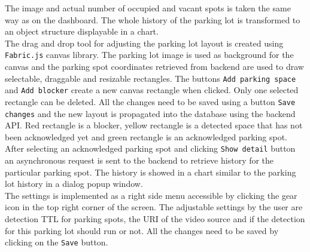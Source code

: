 \documentclass[thesis=M,english]{FITthesis}[2019/03/06]
\begin{document}
The image and actual number of occupied and vacant spots is taken the same way as on the dashboard. The whole history of the parking lot is transformed to an object structure displayable in a chart.\\


The drag and drop tool for adjusting the parking lot layout is created using \texttt{Fabric.js} canvas library. The parking lot image is used as background for the canvas and the parking spot coordinates retrieved from backend are used to draw selectable, draggable and resizable rectangles. The buttons \texttt{Add parking space} and \texttt{Add blocker} create a new canvas rectangle when clicked. Only one selected rectangle can be deleted. All the changes need to be saved using a button \texttt{Save changes} and the new layout is propagated into the database using the backend API. Red rectangle is a blocker, yellow rectangle is a detected space that has not been acknowledged yet and green rectangle is an acknowledged parking spot.\\

After selecting an acknowledged parking spot and clicking \texttt{Show detail} button an asynchronous request is sent to the backend to retrieve history for the particular parking spot. The history is showed in a chart similar to the parking lot history in a dialog popup window.\\

The settings is implemented as a right side menu accessible by clicking the gear icon in the top right corner of the screen. The adjustable settings by the user are detection TTL for parking spots, the URI of the video source and if the detection for this parking lot should run or not. All the changes need to be saved by clicking on the \texttt{Save} button.
\end{document}

